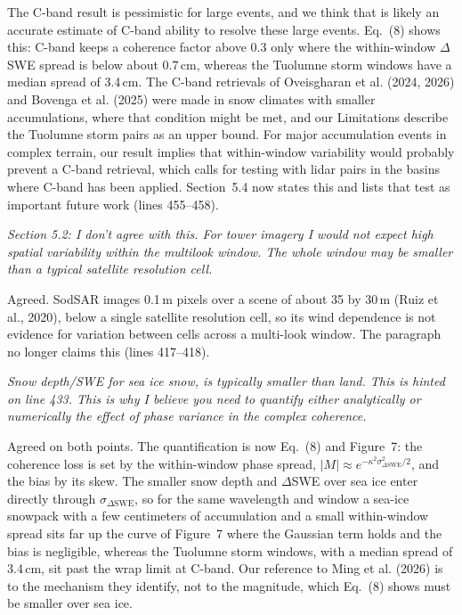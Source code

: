 \documentclass[tc, manuscript]{copernicus}
\begin{document}
The C-band result is pessimistic for large events, and we think that is likely an accurate estimate of C-band ability to resolve these large events. Eq.~(8) shows this: C-band keeps a coherence factor above 0.3 only where the within-window $\Delta$SWE spread is below about 0.7\,cm, whereas the Tuolumne storm windows have a median spread of 3.4\,cm. The C-band retrievals of Oveisgharan et al. (2024, 2026) and Bovenga et al. (2025) were made in snow climates with smaller accumulations, where that condition might be met, and our Limitations describe the Tuolumne storm pairs as an upper bound. For major accumulation events in complex terrain, our result implies that within-window variability would probably prevent a C-band retrieval, which calls for testing with lidar pairs in the basins where C-band has been applied. Section~5.4 now states this and lists that test as important future work (lines 455--458).

\textit{Section 5.2: I don't agree with this. For tower imagery I would not expect high spatial variability within the multilook window. The whole window may be smaller than a typical satellite resolution cell.}

Agreed. SodSAR images 0.1\,m pixels over a scene of about 35 by 30\,m (Ruiz et al., 2020), below a single satellite resolution cell, so its wind dependence is not evidence for variation between cells across a multi-look window. The paragraph no longer claims this (lines 417--418).

\textit{Snow depth/SWE for sea ice snow, is typically smaller than land. This is hinted on line 433. This is why I believe you need to quantify either analytically or numerically the effect of phase variance in the complex coherence.}

Agreed on both points. The quantification is now Eq.~(8) and Figure~7: the coherence loss is set by the within-window phase spread, $|M| \approx e^{-\kappa^2\sigma_{\Delta\mathrm{SWE}}^2/2}$, and the bias by its skew. The smaller snow depth and $\Delta$SWE over sea ice enter directly through $\sigma_{\Delta\mathrm{SWE}}$, so for the same wavelength and window a sea-ice snowpack with a few centimeters of accumulation and a small within-window spread sits far up the curve of Figure~7 where the Gaussian term holds and the bias is negligible, whereas the Tuolumne storm windows, with a median spread of 3.4\,cm, sit past the wrap limit at C-band. Our reference to Ming et al. (2026) is to the mechanism they identify, not to the magnitude, which Eq.~(8) shows must be smaller over sea ice.
\end{document}
